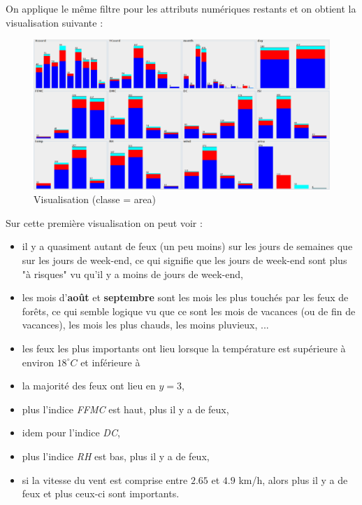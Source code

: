 \documentclass{article}
\begin{document}
\begin{sffamily}
\newpage
On applique le même filtre pour les attributs numériques restants et on obtient la visualisation suivante :

\begin{figure}[h!]
    \begin{center}
    \includegraphics[scale=0.3]{img_002.pdf}
    \caption{Visualisation (classe = area)}
    \end{center}	
\end{figure}

Sur cette première visualisation on peut voir :
\begin{itemize}
\item il y a quasiment autant de feux (un peu moins) sur les jours de semaines que sur les jours de week-end, ce qui signifie 
que les jours de week-end sont plus "à risques" vu qu'il y a moins de jours de week-end,
\item les mois d'\textbf{août} et \textbf{septembre} sont les mois les plus touchés par les feux de forêts, ce qui semble 
logique vu que ce sont les mois de vacances (ou de fin de vacances), les mois les plus chauds, les moins pluvieux, ...
\item les feux les plus importants ont lieu lorsque la température est supérieure à environ $18^\circ C$ et inférieure à 
\item la majorité des feux ont lieu en $y=3$,
\item plus l'indice \textit{FFMC} est haut, plus il y a de feux,
\item idem pour l'indice \textit{DC},
\item plus l'indice \textit{RH} est bas, plus il y a de feux,
\item si la vitesse du vent est comprise entre $2.65$ et $4.9$ km/h, alors plus il y a de feux et plus ceux-ci sont importants.
\\
\end{itemize}


\end{sffamily}
\end{document}
